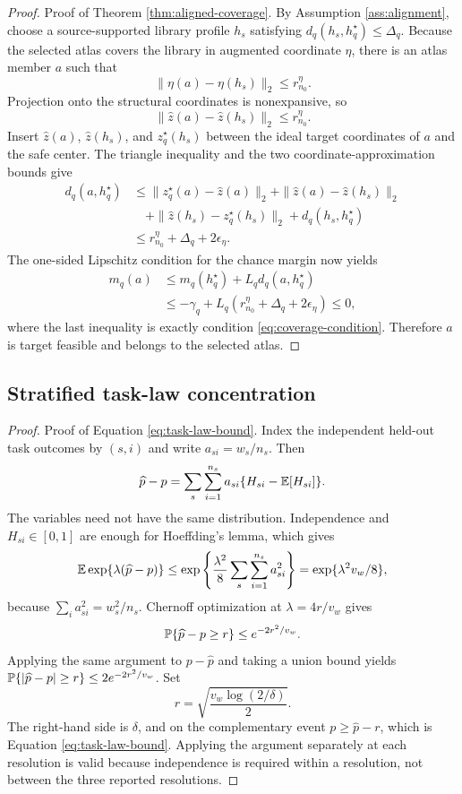 \begin{proof}{Proof of Theorem \ref{thm:aligned-coverage}.}
By Assumption \ref{ass:alignment}, choose a source-supported library profile
$h_s$ satisfying
$d_q(h_s,h_q^\star)\le\Delta_q$.  Because the selected atlas covers the
library in augmented coordinate $\eta$, there is an atlas member $a$ such that
\[
 \|\eta(a)-\eta(h_s)\|_2\le r_{n_0}^\eta.
\]
Projection onto the structural coordinates is nonexpansive, so
\[
 \|\widehat z(a)-\widehat z(h_s)\|_2
 \le r_{n_0}^\eta.
\]
Insert $\widehat z(a)$, $\widehat z(h_s)$, and
$z_q^\star(h_s)$ between the ideal target coordinates of $a$ and the safe
center.  The triangle inequality and the two coordinate-approximation bounds
give
\begin{align*}
 d_q(a,h_q^\star)
 &\le \|z_q^\star(a)-\widehat z(a)\|_2
      +\|\widehat z(a)-\widehat z(h_s)\|_2\\
 &\quad
      +\|\widehat z(h_s)-z_q^\star(h_s)\|_2
      +d_q(h_s,h_q^\star)\\
 &\le r_{n_0}^\eta+\Delta_q+2\epsilon_\eta.
\end{align*}
The one-sided Lipschitz condition for the chance margin now yields
\begin{align*}
 m_q(a)
 &\le m_q(h_q^\star)+L_qd_q(a,h_q^\star)\\
 &\le -\gamma_q
      +L_q(r_{n_0}^\eta+\Delta_q+2\epsilon_\eta)
 \le0,
\end{align*}
where the last inequality is exactly condition
\eqref{eq:coverage-condition}.  Therefore $a$ is target feasible and belongs
to the selected atlas.
\end{proof}

\subsection{Stratified task-law concentration}\label{app:proof-task-law}

\begin{proof}{Proof of Equation \eqref{eq:task-law-bound}.}
Index the independent held-out task outcomes by $(s,i)$ and write
$a_{si}=w_s/n_s$.  Then
\[
 \widehat p-p
 =\sum_s\sum_{i=1}^{n_s}a_{si}
   \{H_{si}-\mathbb{E}[H_{si}]\}.
\]
The variables need not have the same distribution.  Independence and
$H_{si}\in[0,1]$ are enough for Hoeffding's lemma, which gives
\[
 \mathbb{E}\exp\{\lambda(\widehat p-p)\}
 \le \exp\left\{\frac{\lambda^2}{8}
        \sum_s\sum_{i=1}^{n_s}a_{si}^2\right\}
 =\exp\{\lambda^2v_w/8\},
\]
because $\sum_i a_{si}^2=w_s^2/n_s$.  Chernoff optimization at
$\lambda=4r/v_w$ gives
\[
 \mathbb{P}\{\widehat p-p\ge r\}\le e^{-2r^2/v_w}.
\]
Applying the same argument to $p-\widehat p$ and taking a union bound yields
$\mathbb{P}\{|\widehat p-p|\ge r\}\le2e^{-2r^2/v_w}$.  Set
\[
 r=\sqrt{\frac{v_w\log(2/\delta)}{2}}.
\]
The right-hand side is $\delta$, and on the complementary event
$p\ge\widehat p-r$, which is Equation \eqref{eq:task-law-bound}.  Applying the
argument separately at each resolution is valid because independence is
required within a resolution, not between the three reported resolutions.
\end{proof}


